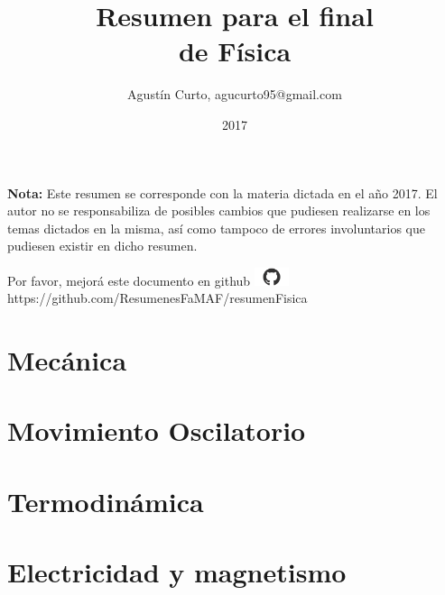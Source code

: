 \documentclass[12pt,a4paper]{article}
\author{Agustín Curto, agucurto95@gmail.com}
\title{Resumen para el final \\ de Física}
\date{2017}
\newcommand{\PN}{\par\noindent}
\begin{document}
	\clearpage\maketitle
	\thispagestyle{empty}
	\tableofcontents

	\vspace{5cm}
	\PN \textbf{Nota:} Este resumen se corresponde con la materia dictada en el año 2017. El autor no se responsabiliza de
	posibles cambios que pudiesen realizarse en los temas dictados en la misma, así como tampoco de errores involuntarios
	que pudiesen existir en dicho resumen.

	\vspace{\fill}
	\begin{center}
		Por favor, mejorá este documento en github
		\includegraphics[width=1cm]{graphics/github.png} \\
		https://github.com/ResumenesFaMAF/resumenFisica
	\end{center}

	\pagebreak
	
	\part{Mecánica}
		
		
		
		
		
		
		
		
		
		
		
		
		

	\part{Movimiento Oscilatorio}
		
		
		
		
		

	\part{Termodinámica}
		
		
		
		
		
		
		
		
		

	\part{Electricidad y magnetismo}
		
		
		
		
		
		
\end{document}
